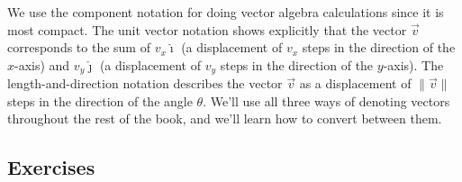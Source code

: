 			\noindent
			We use the component notation for doing vector algebra calculations since it is most compact.
			The unit vector notation shows explicitly that the vector $\vec{v}$ corresponds to the sum of
			$v_x\hat{\imath}$ (a displacement of $v_x$ steps in the direction of the $x$-axis)
			and $v_y\hat{\jmath}$ (a displacement of $v_y$ steps in the direction of the $y$-axis).
			The length-and-direction notation describes the vector $\vec{v}$
			as a displacement of $\|\vec{v}\|$ steps in the direction of the angle $\theta$.
			We'll use all three ways of denoting vectors throughout the rest of the book,
			and we'll learn how to convert between them.


	\subsection{Exercises}
	\label{basis:exercises}

		

